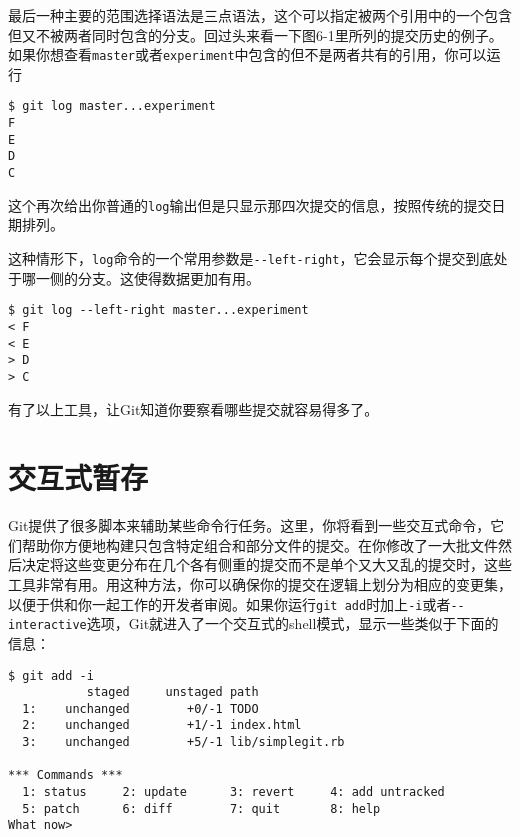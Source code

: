 \documentclass[a4paper]{book}
\begin{document}
最后一种主要的范围选择语法是三点语法，这个可以指定被两个引用中的一个包含但又不被两者同时包含的分支。回过头来看一下图6-1里所列的提交历史的例子。 如果你想查看\texttt{master}或者\texttt{experiment}中包含的但不是两者共有的引用，你可以运行

\begin{shaded}\begin{verbatim}
$ git log master...experiment
F
E
D
C
\end{verbatim}\end{shaded}

这个再次给出你普通的\texttt{log}输出但是只显示那四次提交的信息，按照传统的提交日期排列。

这种情形下，\texttt{log}命令的一个常用参数是\texttt{-{}-left-right}，它会显示每个提交到底处于哪一侧的分支。这使得数据更加有用。

\begin{shaded}\begin{verbatim}
$ git log --left-right master...experiment
< F
< E
> D
> C
\end{verbatim}\end{shaded}

有了以上工具，让Git知道你要察看哪些提交就容易得多了。

\section{交互式暂存}

Git提供了很多脚本来辅助某些命令行任务。这里，你将看到一些交互式命令，它们帮助你方便地构建只包含特定组合和部分文件的提交。在你修改了一大批文件然后决定将这些变更分布在几个各有侧重的提交而不是单个又大又乱的提交时，这些工具非常有用。用这种方法，你可以确保你的提交在逻辑上划分为相应的变更集，以便于供和你一起工作的开发者审阅。如果你运行\texttt{git add}时加上\texttt{-i}或者\texttt{-{}-interactive}选项，Git就进入了一个交互式的shell模式，显示一些类似于下面的信息：

\begin{shaded}\begin{verbatim}
$ git add -i
           staged     unstaged path
  1:    unchanged        +0/-1 TODO
  2:    unchanged        +1/-1 index.html
  3:    unchanged        +5/-1 lib/simplegit.rb

*** Commands ***
  1: status     2: update      3: revert     4: add untracked
  5: patch      6: diff        7: quit       8: help
What now> 
\end{verbatim}\end{shaded}
\end{document}
